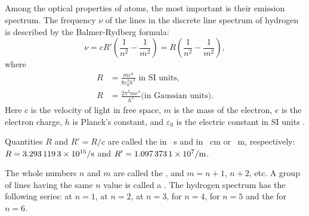 \subsection{}\label{39.1.3} Among the optical properties of atoms, the most important is their emission spectrum. The frequency $\nu$ of the lines in the discrete line spectrum of hydrogen is described by the Balmer-Rydberg formula:
\begin{equation*}%
\nu = cR' \left( \frac{1}{n^{2}} - \frac{1}{m^{2}} \right) = R \left( \frac{1}{n^{2}} - \frac{1}{m^{2}} \right),
\end{equation*}
where
\begin{align*}%
R & = \frac{me^{4}}{8 \varepsilon_{0}^{2} h^{3}} \text{ in SI units},\\
R & = \frac{2 \pi^{2} me^{4}}{h^{3}} \text{(in Gaussian units).}
\end{align*}
Here $c$ is the velocity of light in free space, $m$ is the mass of the electron, $e$ is the electron charge, $h$ is Planck's constant, and $\varepsilon_{0}$ is the electric constant in SI units .

Quantities $R$ and $R' = R/c$ are called the  in \si{\per\second} and in \si{\per\centi\meter} or \si{\per\meter}, respectively: $R = \SI{3.2931193d15}{\per\second}$ and $R' = \SI{1.0973731d7}{\per\meter}$.

The whole numbers $n$ and $m$ are called the , and $m = n + 1$, $n + 2$, etc. A group of lines having the same $n$ value is called a . The hydrogen spectrum has the following series:  at $n = 1$,  at $n = 2$,  at $n = 3$,  for $n = 4$,  for $n = 5$ and the  for $n = 6$.

